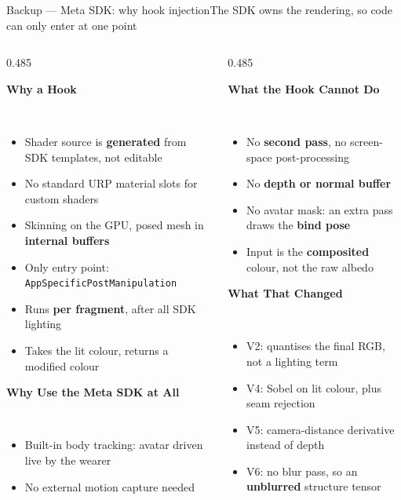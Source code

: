 \documentclass[aspectratio=169,10pt]{beamer}
\newcommand{\hl}[1]{{\color{knblue}\textbf{#1}}}
\newcommand{\bad}[1]{{\color{knred}\textbf{#1}}}
\newcommand{\panelhead}[1]{\noindent\colorbox{kncyan}{\parbox{0.96\textwidth}{\centering\vspace{1pt}\color{white}\scriptsize\bfseries #1\vspace{1pt}}}\\[0.25em]}
\newcommand{\panel}[1]{\noindent\colorbox{knlight}{\parbox{0.96\textwidth}{\vspace{2pt}\scriptsize
\begin{itemize}\setlength{\itemsep}{0.2em}\setlength{\leftmargini}{1.1em}#1\end{itemize}\vspace{2pt}}}}
\begin{document}
\begin{frame}{Backup — Meta SDK: why hook injection}{The SDK owns the rendering, so code can only enter at one point}
  \vspace{0.2em}
  \begin{columns}[T,onlytextwidth]
    \begin{column}{0.485\textwidth}
      \panelhead{Why a Hook}
      \panel{%
        \item Shader source is \hl{generated} from SDK templates, not editable
        \item No standard URP material slots for custom shaders
        \item Skinning on the GPU, posed mesh in \hl{internal buffers}
        \item Only entry point: \texttt{AppSpecificPostManipulation}
        \item Runs \hl{per fragment}, after all SDK lighting
        \item Takes the lit colour, returns a modified colour}
      \vspace{0.4em}
      \panelhead{Why Use the Meta SDK at All}
      \panel{%
        \item Built-in body tracking: avatar driven live by the wearer
        \item No external motion capture needed}
    \end{column}
    \begin{column}{0.485\textwidth}
      \panelhead{What the Hook Cannot Do}
      \panel{%
        \item No \bad{second pass}, no screen-space post-processing
        \item No \bad{depth or normal buffer}
        \item No avatar mask: an extra pass draws the \bad{bind pose}
        \item Input is the \bad{composited} colour, not the raw albedo}
      \vspace{0.4em}
      \panelhead{What That Changed}
      \panel{%
        \item V2: quantises the final RGB, not a lighting term
        \item V4: Sobel on lit colour, plus seam rejection
        \item V5: camera-distance derivative instead of depth
        \item V6: no blur pass, so an \hl{unblurred} structure tensor}
    \end{column}
  \end{columns}
\end{frame}
\end{document}
